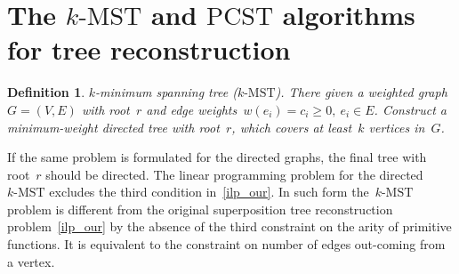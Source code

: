 \documentclass[12pt]{article}
\newtheorem{definition}{Definition}
\begin{document}
\section{The $k\text{-MST}$ and $\text{PCST}$ algorithms for tree reconstruction}

\begin{definition}{$k$-minimum spanning tree ($k\text{-MST}$).}
There given a weighted graph~$G=(V,E)$ with root~$r$ and edge weights~$w(e_i)=c_i\geqslant 0,~e_i\in E$.
Construct a minimum-weight directed tree with root~$r$, which covers at least~$k$ vertices in~$G$.
\end{definition}
If the same problem is formulated for the directed graphs, the final tree with root~$r$ should be directed. The linear programming problem for the directed~$k\text{-MST}$ excludes the third condition in~\eqref{ilp_our}. %
In such form the~$k\text{-MST}$ problem is different from the original superposition tree reconstruction problem~\eqref{ilp_our} by the absence of the third constraint on the arity of primitive functions. It is equivalent to the constraint on number of edges out-coming from a vertex.
\end{document}
